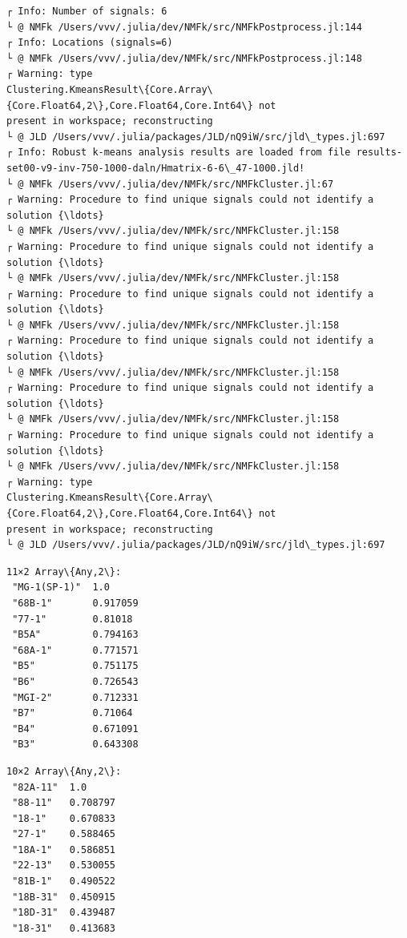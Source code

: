 \documentclass[11pt]{article}
\begin{document}
    \begin{Verbatim}[commandchars=\\\{\}]
┌ Info: Number of signals: 6
└ @ NMFk /Users/vvv/.julia/dev/NMFk/src/NMFkPostprocess.jl:144
┌ Info: Locations (signals=6)
└ @ NMFk /Users/vvv/.julia/dev/NMFk/src/NMFkPostprocess.jl:148
┌ Warning: type
Clustering.KmeansResult\{Core.Array\{Core.Float64,2\},Core.Float64,Core.Int64\} not
present in workspace; reconstructing
└ @ JLD /Users/vvv/.julia/packages/JLD/nQ9iW/src/jld\_types.jl:697
┌ Info: Robust k-means analysis results are loaded from file results-
set00-v9-inv-750-1000-daln/Hmatrix-6-6\_47-1000.jld!
└ @ NMFk /Users/vvv/.julia/dev/NMFk/src/NMFkCluster.jl:67
┌ Warning: Procedure to find unique signals could not identify a solution {\ldots}
└ @ NMFk /Users/vvv/.julia/dev/NMFk/src/NMFkCluster.jl:158
┌ Warning: Procedure to find unique signals could not identify a solution {\ldots}
└ @ NMFk /Users/vvv/.julia/dev/NMFk/src/NMFkCluster.jl:158
┌ Warning: Procedure to find unique signals could not identify a solution {\ldots}
└ @ NMFk /Users/vvv/.julia/dev/NMFk/src/NMFkCluster.jl:158
┌ Warning: Procedure to find unique signals could not identify a solution {\ldots}
└ @ NMFk /Users/vvv/.julia/dev/NMFk/src/NMFkCluster.jl:158
┌ Warning: Procedure to find unique signals could not identify a solution {\ldots}
└ @ NMFk /Users/vvv/.julia/dev/NMFk/src/NMFkCluster.jl:158
┌ Warning: Procedure to find unique signals could not identify a solution {\ldots}
└ @ NMFk /Users/vvv/.julia/dev/NMFk/src/NMFkCluster.jl:158
┌ Warning: type
Clustering.KmeansResult\{Core.Array\{Core.Float64,2\},Core.Float64,Core.Int64\} not
present in workspace; reconstructing
└ @ JLD /Users/vvv/.julia/packages/JLD/nQ9iW/src/jld\_types.jl:697
    \end{Verbatim}

    
    \begin{Verbatim}[commandchars=\\\{\}]
11×2 Array\{Any,2\}:
 "MG-1(SP-1)"  1.0
 "68B-1"       0.917059
 "77-1"        0.81018
 "B5A"         0.794163
 "68A-1"       0.771571
 "B5"          0.751175
 "B6"          0.726543
 "MGI-2"       0.712331
 "B7"          0.71064
 "B4"          0.671091
 "B3"          0.643308
    \end{Verbatim}

    
    
    \begin{Verbatim}[commandchars=\\\{\}]
10×2 Array\{Any,2\}:
 "82A-11"  1.0
 "88-11"   0.708797
 "18-1"    0.670833
 "27-1"    0.588465
 "18A-1"   0.586851
 "22-13"   0.530055
 "81B-1"   0.490522
 "18B-31"  0.450915
 "18D-31"  0.439487
 "18-31"   0.413683
    \end{Verbatim}
\end{document}
